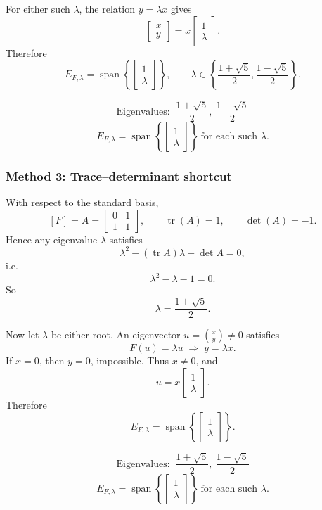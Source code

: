 \documentclass[12pt]{article}
\newcommand{\Span}{\operatorname{span}}
\DeclareMathOperator{\tr}{tr}
\begin{document}
For either such $\lambda$, the relation $y=\lambda x$ gives
\[
\begin{bmatrix}x\\y\end{bmatrix}
=
x\begin{bmatrix}1\\\lambda\end{bmatrix}.
\]
Therefore
\[
E_{F,\lambda}
=
\Span\left\{\begin{bmatrix}1\\\lambda\end{bmatrix}\right\},
\qquad
\lambda\in\left\{\frac{1+\sqrt5}{2},\frac{1-\sqrt5}{2}\right\}.
\]

\[
\boxed{\,\text{Eigenvalues: }\ \dfrac{1+\sqrt5}{2},\ \dfrac{1-\sqrt5}{2}\,}
\]
\[
\boxed{\,
E_{F,\lambda}
=
\Span\left\{\begin{bmatrix}1\\\lambda\end{bmatrix}\right\}
\ \text{for each such }\lambda.
\,}
\]

\newpage
\subsubsection{Method 3: Trace--determinant shortcut}

With respect to the standard basis,
\[
[F]=A=
\begin{bmatrix}
0&1\\
1&1
\end{bmatrix},
\qquad
\tr(A)=1,\qquad
\det(A)=-1.
\]
Hence any eigenvalue $\lambda$ satisfies
\[
\lambda^2-(\tr A)\lambda+\det A=0,
\]
i.e.
\[
\lambda^2-\lambda-1=0.
\]
So
\[
\lambda=\frac{1\pm\sqrt5}{2}.
\]

Now let $\lambda$ be either root. An eigenvector $u=\binom{x}{y}\neq 0$ satisfies
\[
F(u)=\lambda u
\;\Longrightarrow\;
y=\lambda x.
\]
If $x=0$, then $y=0$, impossible. Thus $x\neq 0$, and
\[
u=x\begin{bmatrix}1\\\lambda\end{bmatrix}.
\]
Therefore
\[
E_{F,\lambda}
=
\Span\left\{\begin{bmatrix}1\\\lambda\end{bmatrix}\right\}.
\]

\[
\boxed{\,\text{Eigenvalues: }\ \dfrac{1+\sqrt5}{2},\ \dfrac{1-\sqrt5}{2}\,}
\]
\[
\boxed{\,
E_{F,\lambda}
=
\Span\left\{\begin{bmatrix}1\\\lambda\end{bmatrix}\right\}
\ \text{for each such }\lambda.
\,}
\]
\end{document}
